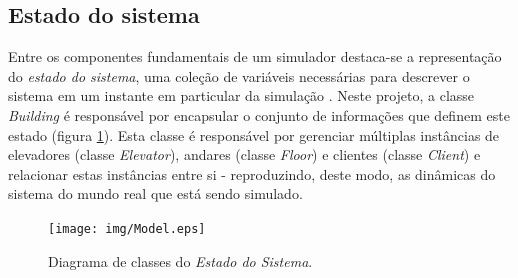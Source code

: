 \subsection{Estado do sistema}

Entre os componentes fundamentais de um simulador destaca-se a representação do
\textit{estado do sistema}, uma coleção de variáveis necessárias para descrever
o sistema em um instante em particular da simulação \cite{Law}. Neste projeto, a
classe \textit{Building} é responsável por encapsular o conjunto de informações
que definem este estado (figura \ref{fig:diagram:model}). Esta classe é
responsável por gerenciar múltiplas instâncias de elevadores (classe
\textit{Elevator}), andares (classe \textit{Floor}) e clientes (classe
\textit{Client}) e relacionar estas instâncias entre si - reproduzindo, deste
modo, as dinâmicas do sistema do mundo real que está sendo simulado.

\begin{figure}[htb!]
  \centering
  \texttt{[image: img/Model.eps]}
  \caption{Diagrama de classes do \textit{Estado do Sistema}.}
\label{fig:diagram:model}
\end{figure}

